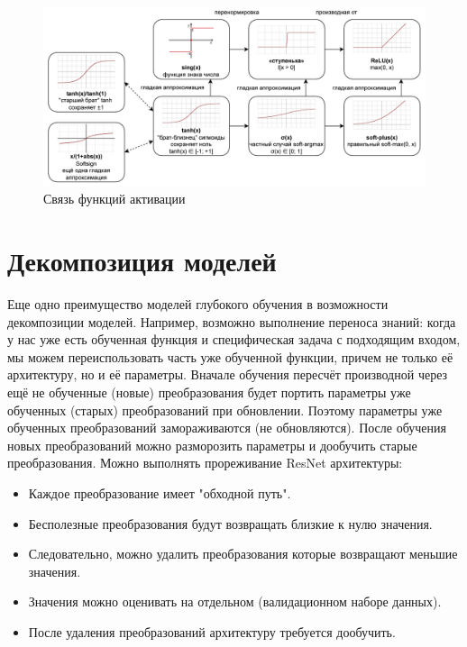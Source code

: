 \begin{figure}[htb]
    \centering
    \includegraphics[scale=0.35]{images/connection-of-activation-functions.png}
    \caption{Связь функций активации}
\end{figure}

\section{Декомпозиция моделей}

Еще одно преимущество моделей глубокого обучения в возможности декомпозиции моделей. Например, возможно выполнение переноса знаний: когда у нас уже есть обученная функция и специфическая задача с подходящим входом, мы можем переиспользовать часть уже обученной функции, причем не только её архитектуру, но и её параметры.\newline
Вначале обучения пересчёт производной через ещё не обученные (новые) преобразования будет портить параметры уже обученных (старых) преобразований при обновлении. Поэтому параметры уже обученных преобразований замораживаются (не обновляются). После обучения новых преобразований можно разморозить параметры и дообучить старые преобразования.\newline
Можно выполнять прореживание ResNet архитектуры:
\begin{itemize}
    \item Каждое преобразование имеет "обходной путь".
    \item Бесполезные преобразования будут возвращать близкие к нулю значения.
    \item Следовательно, можно удалить преобразования которые возвращают меньшие значения.
    \item Значения можно оценивать на отдельном (валидационном наборе данных).
    \item После удаления преобразований архитектуру требуется дообучить.
\end{itemize}

